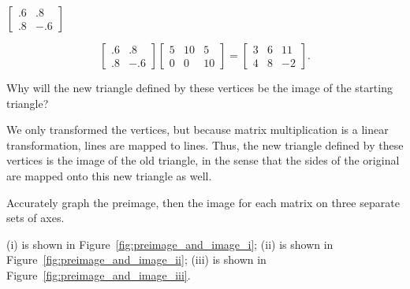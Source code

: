 \documentclass[../key.tex]{subfiles}
\begin{document}
\begin{iinner_problem}
\item $\left[\begin{array}{cc}.6 & .8 \\ .8 & -.6 \end{array}\right]$
\end{iinner_problem}

$$\begin{bmatrix} .6 & .8 \\ .8 & -.6 \end{bmatrix} \begin{bmatrix} 5 & 10 & 5 \\ 0 & 0 & 10 \end{bmatrix} = \begin{bmatrix} 3 & 6 & 11 \\ 4 & 8 & -2 \end{bmatrix}.$$

\begin{inner_problem}
\item Why will the new triangle defined by these vertices be the image of the starting triangle?
\end{inner_problem}

We only transformed the vertices, but because matrix multiplication is a linear transformation, lines are mapped to lines. Thus, the new triangle defined by these vertices is the image of the old triangle, in the sense that the sides of the original are mapped onto this new triangle as well.

\begin{inner_problem}
\item Accurately graph the preimage, then the image for each matrix on three separate sets of axes.
\end{inner_problem}

(i) is shown in Figure~\ref{fig:preimage_and_image_i}; (ii) is shown in Figure~\ref{fig:preimage_and_image_ii}; (iii) is shown in Figure~\ref{fig:preimage_and_image_iii}.
\end{document}
